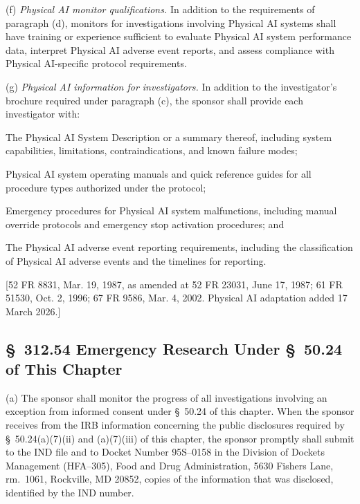 \documentclass[11pt]{article}
\begin{document}
(f) \textit{Physical AI monitor qualifications.} In addition to the requirements of paragraph (d), monitors for investigations involving Physical AI systems shall have training or experience sufficient to evaluate Physical AI system performance data, interpret Physical AI adverse event reports, and assess compliance with Physical AI-specific protocol requirements.

(g) \textit{Physical AI information for investigators.} In addition to the investigator's brochure required under paragraph (c), the sponsor shall provide each investigator with:

\begin{description}[leftmargin=0.8cm,style=sameline]
\item[(i)] The Physical AI System Description or a summary thereof, including system capabilities, limitations, contraindications, and known failure modes;
\item[(ii)] Physical AI system operating manuals and quick reference guides for all procedure types authorized under the protocol;
\item[(iii)] Emergency procedures for Physical AI system malfunctions, including manual override protocols and emergency stop activation procedures; and
\item[(iv)] The Physical AI adverse event reporting requirements, including the classification of Physical AI adverse events and the timelines for reporting.
\end{description}

[52 FR 8831, Mar. 19, 1987, as amended at 52 FR 23031, June 17, 1987; 61 FR 51530, Oct. 2, 1996; 67 FR 9586, Mar. 4, 2002. Physical AI adaptation added 17 March 2026.]

\subsection{\S~312.54 Emergency Research Under \S~50.24 of This Chapter}

(a) The sponsor shall monitor the progress of all investigations involving an exception from informed consent under \S~50.24 of this chapter. When the sponsor receives from the IRB information concerning the public disclosures required by \S~50.24(a)(7)(ii) and (a)(7)(iii) of this chapter, the sponsor promptly shall submit to the IND file and to Docket Number 95S--0158 in the Division of Dockets Management (HFA--305), Food and Drug Administration, 5630 Fishers Lane, rm.~1061, Rockville, MD 20852, copies of the information that was disclosed, identified by the IND number.
\end{document}
